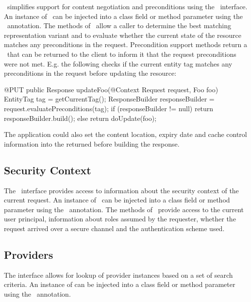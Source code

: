\jaxrs\ simplifies support for content negotiation and preconditions using the \Request\ interface. An instance of \Request\ can be injected into a class field or method parameter using the \Context\ annotation. The methods of \Request\ allow a caller to determine the best matching representation variant and to evaluate whether the current state of the resource matches any preconditions in the request. Precondition support methods return a \ResponseBuilder\ that can be returned to the client to inform it that the request preconditions were not met. E.g. the following checks if the current entity tag matches any preconditions in the request before updating the resource:

\begin{listing}{1}
@PUT
public Response updateFoo(@Context Request request, Foo foo) {
	EntityTag tag = getCurrentTag();
	ResponseBuilder responseBuilder = request.evaluatePreconditions(tag);
	if (responseBuilder != null)
	  return responseBuilder.build();
	else
	  return doUpdate(foo);
}
\end{listing}


The application could also set the content location, expiry date and cache control information into the returned  before building the response.

\subsection{Security Context}
\label{security_context}

The \SecurityContext\ interface provides access to information about the security context of the current request. An instance of \SecurityContext\ can be injected into a class field or method parameter using the \Context\ annotation. The methods of \SecurityContext\ provide access to the current user principal, information about roles assumed by the requester, whether the request arrived over a secure channel and the authentication scheme used.

\subsection{Providers}
\label{providercontext}

The  interface allows for lookup of provider instances based on a set of search criteria. An instance of  can be injected into a class field or method parameter using the \Context\ annotation.

